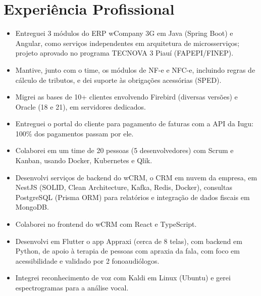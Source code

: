 \section{Experiência Profissional}

\begin{itemize}
	\item Entreguei 3 módulos do ERP wCompany 3G em Java (Spring Boot) e Angular, como serviços independentes em arquitetura de microsserviços; projeto aprovado no programa TECNOVA 3 Piauí (FAPEPI/FINEP).
	\item Mantive, junto com o time, os módulos de NF-e e NFC-e, incluindo regras de cálculo de tributos, e dei suporte às obrigações acessórias (SPED).
	\item Migrei as bases de 10+ clientes envolvendo Firebird (diversas versões) e Oracle (18 e 21), em servidores dedicados.
	\item Entreguei o portal do cliente para pagamento de faturas com a API da Iugu: 100\% dos pagamentos passam por ele.
	\item Colaborei em um time de 20 pessoas (5 desenvolvedores) com Scrum e Kanban, usando Docker, Kubernetes e Qlik.
\end{itemize}

\begin{itemize}
	\item Desenvolvi serviços de backend do wCRM, o CRM em nuvem da empresa, em NestJS (SOLID, Clean Architecture, Kafka, Redis, Docker), consultas PostgreSQL (Prisma ORM) para relatórios e integração de dados fiscais em MongoDB.
	\item Colaborei no frontend do wCRM com React e TypeScript.
\end{itemize}

\begin{itemize}
	\item Desenvolvi em Flutter o app Appraxi (cerca de 8 telas), com backend em Python, de apoio à terapia de pessoas com apraxia da fala, com foco em acessibilidade e validado por 2 fonoaudiólogos.
	\item Integrei reconhecimento de voz com Kaldi em Linux (Ubuntu) e gerei espectrogramas para a análise vocal.
\end{itemize}

